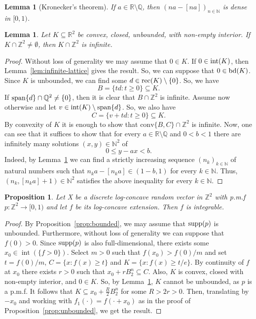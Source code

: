 \documentclass[11pt,a4paper]{article} %
\newtheorem{lemma}[theorem]{Lemma}
\newtheorem{proposition}[theorem]{Proposition}
\theoremstyle{definition}
\theoremstyle{remark}
\newcommand{\conv}{\mathrm{conv}}
\newcommand{\1}{\mathds{1}}
\begin{document}
\begin{lemma}[Kronecker's theorem]\label{lem:kronecker} 
If $a \in \mathbb{R} \setminus \mathbb{Q}$, then $(na-[na])_{n \in \mathbb{N}}$ is dense in $[0,1)$.
\end{lemma}

\begin{lemma}\label{lem:R^2}
    Let $K \subseteq \mathbb{R}^2$ be convex, closed, unbounded, with non-empty interior. If $K \cap \mathbb{Z}^2 \neq \emptyset$, then $K \cap \mathbb{Z}^2$ is infinite.
    
\end{lemma}

\begin{proof}
    Without loss of generality we may assume that $0 \in K$. If $0 \in {\rm int}(K)$, then  Lemma~\ref{lem:infinite-lattice} gives the result. So, we can suppose that $0 \in {\rm bd}(K)$. Since $K$ is unbounded, we can find some $d \in {\rm rec}(K) \setminus \{0\}$. So, we have $$B=\{td: t\geq 0 \} \subseteq K.$$ If ${\rm span} \{d\} \cap\mathbb{Q}^2 \neq \{0\}$, then it is clear that $B \cap \mathbb{Z}^2$ is infinite. Assume now otherwise and let $v \in {\rm int}(K) \setminus {\rm span}\{d\}$. So, we also have $$C=\{v+td: t \geq 0\} \subseteq K.$$ By convexity of $K$ it is enough to show that $\conv\{B,C\} \cap \mathbb{Z}^2$ is infinite. Now, one can see that it suffices to show that for every $a \in \mathbb{R} \setminus \mathbb{Q}$ and $0<b<1$ there are infinitely many solutions $(x,y) \in \mathbb{N}^2$ of $$0 \leq y-ax <b.$$  Indeed, by Lemma~\ref{lem:kronecker} we can find a strictly increasing sequence $(n_k)_{k \in \mathbb{N}}$ of natural numbers such that $n_k a-[n_ka] \in (1-b,1)$ for every $k \in \mathbb{N}$. Thus,  $(n_k,[n_ka]+1) \in \mathbb{N}^2$ satisfies the above inequality for every $k \in \mathbb{N}$.
\end{proof}

\begin{proposition}\label{prop:Z^2}
    Let X be a discrete log-concave random vector in $\mathbb{Z}^2$ with p.m.f $p: \mathbb{Z}^2 \to [0,1)$ and let $f$ be its log-concave extension. Then $f$ is integrable.
\end{proposition}

\begin{proof}
    By Proposition~\ref{prop:bounded}, we may assume that ${\rm supp}(p)$ is unbounded. Furthermore, without loss of generality we can suppose that $f(0)>0$. Since ${\rm supp}(p)$ is also full-dimensional, there exists some $x_0 \in \operatorname{int}(\{f>0\})$. Select $m>0$ such that $f(x_0)>f(0)/m$ and set $t=f(0)/m$, $C=\{x:f(x) \geq t\}$ and $K=\{x:f(x) \geq t/e\}$. By continuity of $f$ at $x_0$ there exists $r>0$ such that $x_0+rB_2^n \subseteq C$. Also, $K$ is convex, closed with non-empty interior, and $0 \in K$. So, by Lemma~\ref{lem:R^2}, $K$ cannot be unbounded, as $p$ is a p.m.f. It follows that $K \subseteq x_0+\frac{R}{2}B_2^n$ for some $R>2r>0$. Then, translating by $-x_0$ and working with $f_1(\cdot)=f(\cdot +x_0)$ as in the proof of Proposition~\ref{prop:unbounded}, we get the result.
\end{proof}
\end{document}
